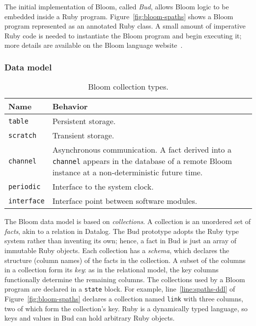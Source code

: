 The initial implementation of Bloom, called \emph{Bud}, allows Bloom logic to be
embedded inside a Ruby program. Figure~\ref{fig:bloom-spaths} shows a Bloom
program represented as an annotated Ruby class. A small amount of imperative
Ruby code is needed to instantiate the Bloom program and begin executing it;
more details are available on the Bloom language website~\cite{bloom}.

\subsubsection{Data model}
\begin{table}[t]
\centering
\begin{tabular}{|l|p{2.32in}|}
\hline
\textbf{Name} & \textbf{Behavior }\\
\hline
\texttt{table} & Persistent storage.\\
\texttt{scratch} & Transient storage.\\
\texttt{channel} & Asynchronous communication. A fact derived into a \texttt{channel} appears in the
database of a remote Bloom instance at a non-deterministic future time.\\
\texttt{periodic} & Interface to the system clock.\\
\texttt{interface} & Interface point between software modules.\\
\hline
\end{tabular}
\caption{Bloom collection types.}
\label{tbl:bloom-collections}
\end{table}

The Bloom data model is based on \emph{collections}.  A collection is an
unordered set of \emph{facts}, akin to a relation in Datalog. The Bud prototype
adopts the Ruby type system rather than inventing its own; hence, a fact in Bud
is just an array of immutable Ruby objects. Each collection has a \emph{schema},
which declares the structure (column names) of the facts in the collection. A
subset of the columns in a collection form its \emph{key}: as in the relational
model, the key columns functionally determine the remaining columns. The
collections used by a Bloom program are declared in a \texttt{state} block. For
example, line~\ref{line:spaths-ddl} of Figure~\ref{fig:bloom-spaths} declares a
collection named \texttt{link} with three columns, two of which form the
collection's key. Ruby is a dynamically typed language, so keys and values in
Bud can hold arbitrary Ruby objects.


